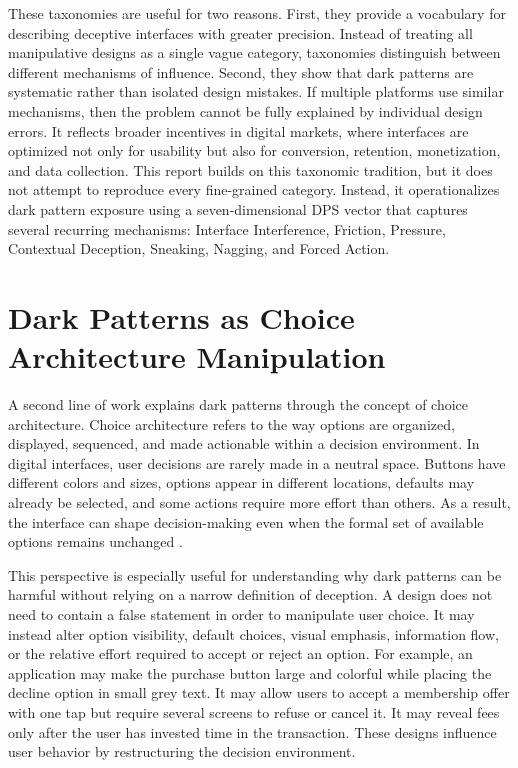 These taxonomies are useful for two reasons. First, they provide a vocabulary for describing deceptive interfaces with greater precision. Instead of treating all manipulative designs as a single vague category, taxonomies distinguish between different mechanisms of influence. Second, they show that dark patterns are systematic rather than isolated design mistakes. If multiple platforms use similar mechanisms, then the problem cannot be fully explained by individual design errors. It reflects broader incentives in digital markets, where interfaces are optimized not only for usability but also for conversion, retention, monetization, and data collection. This report builds on this taxonomic tradition, but it does not attempt to reproduce every fine-grained category. Instead, it operationalizes dark pattern exposure using a seven-dimensional DPS vector that captures several recurring mechanisms: Interface Interference, Friction, Pressure, Contextual Deception, Sneaking, Nagging, and Forced Action.

\section{Dark Patterns as Choice Architecture Manipulation}

A second line of work explains dark patterns through the concept of choice architecture. Choice architecture refers to the way options are organized, displayed, sequenced, and made actionable within a decision environment. In digital interfaces, user decisions are rarely made in a neutral space. Buttons have different colors and sizes, options appear in different locations, defaults may already be selected, and some actions require more effort than others. As a result, the interface can shape decision-making even when the formal set of available options remains unchanged \cite{mathur2021whatmakesdark}.

This perspective is especially useful for understanding why dark patterns can be harmful without relying on a narrow definition of deception. A design does not need to contain a false statement in order to manipulate user choice. It may instead alter option visibility, default choices, visual emphasis, information flow, or the relative effort required to accept or reject an option. For example, an application may make the purchase button large and colorful while placing the decline option in small grey text. It may allow users to accept a membership offer with one tap but require several screens to refuse or cancel it. It may reveal fees only after the user has invested time in the transaction. These designs influence user behavior by restructuring the decision environment.

